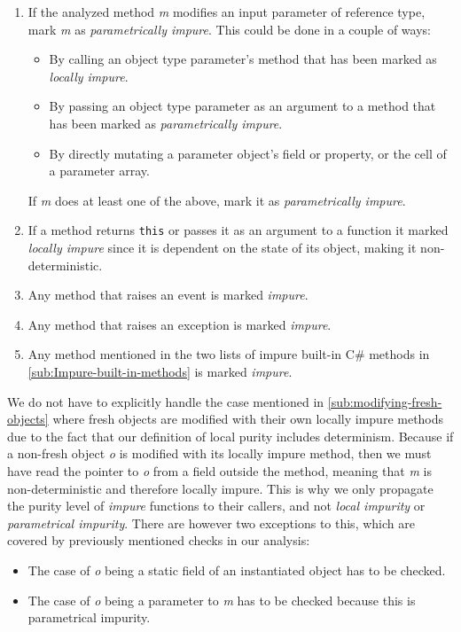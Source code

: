 \documentclass[a4paper,12pt]{article}
\begin{document}
\begin{enumerate}
  \item If the analyzed method \textit{m} modifies an input parameter of reference type, mark \textit{m} as \textit{parametrically impure}. This could be done in a couple of ways: \label{itm:parametrically-impure}
    \begin{itemize}
      \item By calling an object type parameter's method that has been marked as \textit{locally impure}.
      \item By passing an object type parameter as an argument to a method that has been marked as \textit{parametrically impure}.
      \item By directly mutating a parameter object's field or property, or the cell of a parameter array.
    \end{itemize}
    If \textit{m} does at least one of the above, mark it as \textit{parametrically impure}.
  \item If a method returns \texttt{this} or passes it as an argument to a function it marked \textit{locally impure} since it is dependent on the state of its object, making it non-deterministic.
  \item Any method that raises an event is marked \textit{impure}. \label{itm:raises-event}
  \item Any method that raises an exception is marked \textit{impure}. \label{itm:raises-exception}
  \item Any method mentioned in the two lists of impure built-in C\# methods in \autoref{sub:Impure-built-in-methods} is marked \textit{impure}. \label{itm:impure-built-in}
\end{enumerate}

We do not have to explicitly handle the case mentioned in \autoref{sub:modifying-fresh-objects} where fresh objects are modified with their own locally impure methods due to the fact that our definition of local purity includes determinism. Because if a non-fresh object \textit{o} is modified with its locally impure method, then we must have read the pointer to \textit{o} from a field outside the method, meaning that \textit{m} is non-deterministic and therefore locally impure. This is why we only propagate the purity level of \textit{impure} functions to their callers, and not \textit{local impurity} or \textit{parametrical impurity}. There are however two exceptions to this, which are covered by previously mentioned checks in our analysis:
\begin{itemize}
  \item The case of \textit{o} being a static field of an instantiated object has to be checked.
  \item The case of \textit{o} being a parameter to \textit{m} has to be checked because this is parametrical impurity.
\end{itemize}
\end{document}
